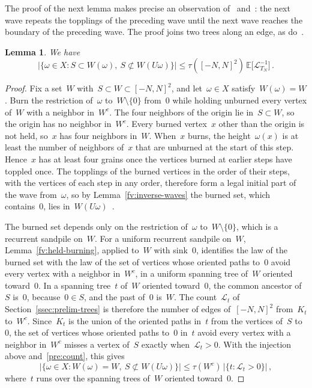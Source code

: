 \documentclass[11pt]{amsart}
\numberwithin{equation}{section}
\newtheorem{lemma}[equation]{Lemma}
\newcommand{\EE}{\mathbb E}
\newcommand{\cL}{\mathscr{L}}
\begin{document}
The proof of the next lemma makes precise an observation of~\citet[page~2095]{PriezzhevKtitarevIvashkevich1996} and~\citet[page~2]{PaczuskiBoettcher1997}: the next wave repeats the topplings of the preceding wave until the next wave reaches the boundary of the preceding wave. The proof joins two trees along an edge, as do~\citet[proof of Lemma~5]{LevinePeres2014}.

\begin{lemma}\label{fv:outflow}
We have
\begin{equation*}
 \bigl|\{\omega\in X:S\subset W(\omega),\ S\not\subset W(U\omega)\}\bigr|\leq\tau([-N,N]^2)\,\EE\bigl[\cL_{T_N}^{-1}\bigr]\,.
\end{equation*}
\end{lemma}

\begin{proof}
Fix a set~$W$ with~$S\subset W\subset [-N,N]^2$, and let~$\omega\in X$ satisfy~$W(\omega)=W$. Burn the restriction of~$\omega$ to~$W\setminus\{0\}$ from~$0$ while holding unburned every vertex of~$W$ with a neighbor in~$W^c$. The four neighbors of the origin lie in~$S\subset W$, so the origin has no neighbor in~$W^c$. Every burned vertex~$x$ other than the origin is not held, so~$x$ has four neighbors in~$W$. When~$x$ burns, the height~$\omega(x)$ is at least the number of neighbors of~$x$ that are unburned at the start of this step. Hence~$x$ has at least four grains once the vertices burned at earlier steps have toppled once. The topplings of the burned vertices in the order of their steps, with the vertices of each step in any order, therefore form a legal initial part of the wave from~$\omega$, so by Lemma~\ref{fv:inverse-waves} the burned set, which contains~$0$, lies in~$W(U\omega)$~\citep[compare][equation~(7.2)]{JaraiRedig2008}.

The burned set depends only on the restriction of~$\omega$ to~$W\setminus\{0\}$, which is a recurrent sandpile on~$W$. For a uniform recurrent sandpile on~$W$, Lemma~\ref{fv:held-burning}, applied to~$W$ with sink~$0$, identifies the law of the burned set with the law of the set of vertices whose oriented paths to~$0$ avoid every vertex with a neighbor in~$W^c$, in a uniform spanning tree of~$W$ oriented toward~$0$. In a spanning tree~$t$ of~$W$ oriented toward~$0$, the common ancestor of~$S$ is~$0$, because~$0\in S$, and the past of~$0$ is~$W$. The count~$\cL_t$ of Section~\ref{ssec:prelim-trees} is therefore the number of edges of~$[-N,N]^2$ from~$K_t$ to~$W^c$. Since~$K_t$ is the union of the oriented paths in~$t$ from the vertices of~$S$ to~$0$, the set of vertices whose oriented paths to~$0$ in~$t$ avoid every vertex with a neighbor in~$W^c$ misses a vertex of~$S$ exactly when~$\cL_t>0$. With the injection above and~\eqref{pre:count}, this gives
\begin{equation*}
 \bigl|\{\omega\in X:W(\omega)=W,\ S\not\subset W(U\omega)\}\bigr|\leq\tau(W^c)\,\bigl|\{t:\cL_t>0\}\bigr|\,,
\end{equation*}
where~$t$ runs over the spanning trees of~$W$ oriented toward~$0$.


\end{proof}
\end{document}
